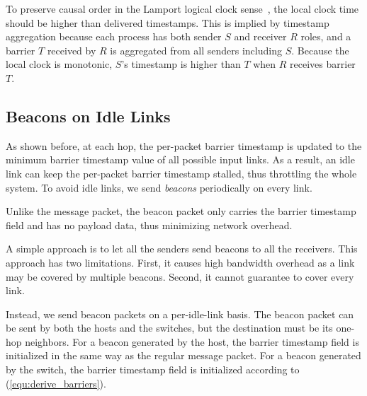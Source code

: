 

To preserve causal order in the Lamport logical clock sense~\cite{lamport1978time}, the local clock time should be higher than delivered timestamps.
This is implied by timestamp aggregation because each process has both sender $S$ and receiver $R$ roles, and a barrier $T$ received by $R$ is aggregated from all senders including $S$.
Because the local clock is monotonic, $S$'s timestamp is higher than $T$ when $R$ receives barrier $T$.



\subsection{Beacons on Idle Links}
\label{sec:beacon}

As shown before, at each hop, the per-packet barrier timestamp is updated to the minimum barrier timestamp value of all possible input links.
As a result, an idle link can keep the per-packet barrier timestamp stalled, thus throttling the whole system.
To avoid idle links, we send \textit{beacons} periodically on every link.



Unlike the message packet, the beacon packet only carries the barrier timestamp field and has no payload data, thus minimizing network overhead. 

A simple approach is to let all the senders send beacons to all the receivers. This approach has two limitations. First, it causes high bandwidth overhead as a link may be covered by multiple beacons. Second, it cannot guarantee to cover every link.

Instead, we send beacon packets on a per-idle-link basis.
The beacon packet can be sent by both the hosts and the switches,
but the destination must be its one-hop neighbors. For a beacon generated by the host, the barrier timestamp field is initialized in the same way as the regular message packet. For a beacon generated by the switch, the barrier timestamp field is initialized according to (\ref{equ:derive_barriers}).

